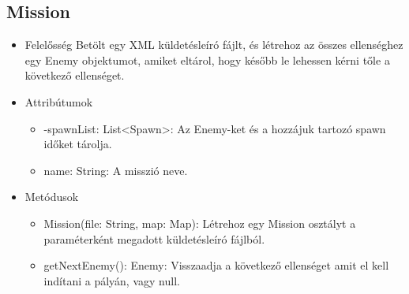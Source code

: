 \subsection{Mission}
\begin{itemize}
\item Felelősség\newline
Betölt egy XML küldetésleíró fájlt, és létrehoz az összes ellenséghez egy Enemy objektumot, amiket eltárol, hogy később le lehessen kérni tőle a következő ellenséget.
\item Attribútumok\newline
	\begin{itemize}
		\item -spawnList: List<Spawn>: Az Enemy-ket és a hozzájuk tartozó spawn időket tárolja.
		\item name: String: A misszió neve.
	\end{itemize}
\item Metódusok\newline
	\begin{itemize}
		\item Mission(file: String, map: Map): Létrehoz egy Mission osztályt a paraméterként megadott küldetésleíró fájlból.
		\item getNextEnemy(): Enemy: Visszaadja a következő ellenséget amit el kell indítani a pályán, vagy null.
	\end{itemize}
\end{itemize}

